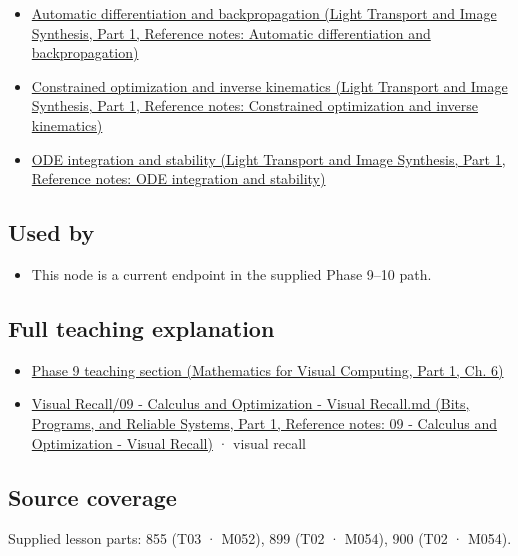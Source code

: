 \begin{itemize}
\tightlist
\item
  \href{../04-Light-Transport-and-Image-Synthesis-P01/main.pdf\#appendix-40df0855b4a7}{Automatic differentiation and backpropagation (Light Transport and Image Synthesis, Part 1, Reference notes: Automatic differentiation and backpropagation)}
\item
  \href{../04-Light-Transport-and-Image-Synthesis-P01/main.pdf\#appendix-29f4bea4c2bb}{Constrained optimization and inverse kinematics (Light Transport and Image Synthesis, Part 1, Reference notes: Constrained optimization and inverse kinematics)}
\item
  \href{../04-Light-Transport-and-Image-Synthesis-P01/main.pdf\#appendix-18eacf61a04b}{ODE integration and stability (Light Transport and Image Synthesis, Part 1, Reference notes: ODE integration and stability)}
\end{itemize}

\subsection{Used by}\label{appendix-8836553d56fc-used-by}

\hypertarget{appendix-8836553d56fc-used-by}{}

\begin{itemize}
\tightlist
\item
  This node is a current endpoint in the supplied Phase 9--10 path.
\end{itemize}

\subsection{Full teaching explanation}\label{appendix-8836553d56fc-full-teaching-explanation}

\hypertarget{appendix-8836553d56fc-full-teaching-explanation}{}

\begin{itemize}
\tightlist
\item
  \href{../02-Mathematics-for-Visual-Computing-P01/main.pdf\#02-foundations-ii-ch022-numerical-differentiation-and-automatic-differentiation}{Phase 9 teaching section (Mathematics for Visual Computing, Part 1, Ch. 6)}
\item
  \href{../01-Bits-Programs-and-Reliable-Systems-P01/main.pdf\#appendix-adf48f5dc5c1}{Visual Recall/09 - Calculus and Optimization - Visual Recall.md (Bits, Programs, and Reliable Systems, Part 1, Reference notes: 09 - Calculus and Optimization - Visual Recall)} · visual recall
\end{itemize}

\subsection{Source coverage}\label{appendix-8836553d56fc-source-coverage}

\hypertarget{appendix-8836553d56fc-source-coverage}{}

Supplied lesson parts: 855 (T03 · M052), 899 (T02 · M054), 900 (T02 · M054).

